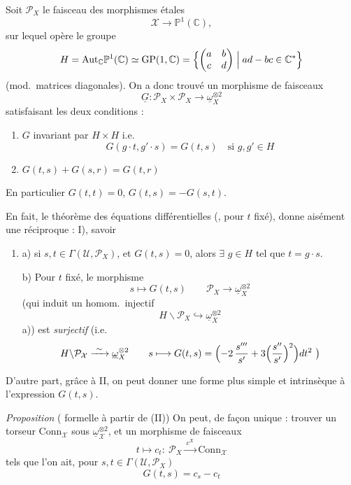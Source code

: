\documentclass[11pt,a4paper]{article}
\begin{document}
 Soit $\mathcal{P}_X$ le faisceau des morphismes  étales
\[
\mathcal{X}\to\mathbb{P}^1(\mathbb{C}),
\]
sur lequel opère le groupe
\[
H=\mathrm{Aut}_{\mathbb{C}}\mathbb{P}^1(\mathbb{C})\simeq\mathrm{GP}(1,\mathbb{C})=\Bigl\{\begin{pmatrix}a&b\\c&d\end{pmatrix}\Bigm|ad-bc\in\mathbb{C}^*\Bigr\}
\]
(mod.\ matrices diagonales). On a donc trouvé un morphisme de faisceaux
\[
\underline{G}:\mathcal{P}_X\times\mathcal{P}_X\to\underline{\omega}_X^{\otimes2}
\]
satisfaisant les deux conditions :
\begin{enumerate}
\item[I)] $G$ invariant par $H\times H$ i.e.
\[
G(g\cdot t,g'\cdot s)=G(t,s)\quad\text{si }g,g'\in H
\]
\item[II)] $G(t,s)+G(s,r)=G(t,r)$
\end{enumerate}
En particulier $G(t,t)=0$, $G(t,s)=-G(s,t)$.

En fait, le théorème des équations différentielles (, pour $t$ fixé), donne aisément une réciproque : I), savoir

\begin{enumerate}
\item[I')] a) si $s,t\in\Gamma(\mathcal{U},\mathcal{P}_X)$,  \struck{\ill{}} et $G(t,s)=0$, alors $\exists$ \struck{\ill{}} $g\in H$ tel que $t=g\cdot s$.

b) Pour $t$ fixé, le morphisme
\[
s\longmapsto G(t,s)\qquad\mathcal{P}_X\to\underline{\omega}_X^{\otimes2}
\]
(qui induit un homom.\ injectif 
\[
H\backslash\mathcal{P}_X\hookrightarrow\underline{\omega}_X^{\otimes2}
\]
 a)) est \emph{surjectif} (i.e.
\[
H\backslash\mathcal{P}_{\mathcal{X}}\xrightarrow{\ \sim\ }\underline{\omega}_X^{\otimes2}\qquad s\longmapsto G(t,s)=\Bigl(-2\,\frac{s'''}{s'}+3\Bigl(\frac{s''}{s'}\Bigr)^2\Bigr)dt^2\ \bigr)
\]
\end{enumerate}

D'autre part, grâce à II, on peut donner une forme plus simple et intrinsèque à l'expression $G(t,s)$.

\emph{Proposition} ( formelle à partir de (II)) On peut, de façon unique : trouver un torseur $\mathrm{Conn}_{\mathcal{X}}$ sous $\underline{\omega}_{\mathcal{X}}^{\otimes2}$, et un morphisme de faisceaux
\[
t\longmapsto c_t:\ \mathcal{P}_X\xrightarrow{\ c^X\ }\mathrm{Conn}_{\mathcal{X}}
\]
tels que l'on ait, pour $s,t\in\Gamma(\mathcal{U},\mathcal{P}_X)$
\[
\boxed{G(t,s)=c_s-c_t}
\]
\end{document}
